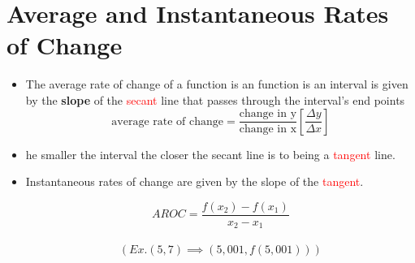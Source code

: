 \documentclass{article}
\begin{document}
\section{Average and Instantaneous Rates of Change }
\begin{itemize}
    \item The average rate of change of a function is an function is an interval is given by the \textbf{slope} of the \textcolor{red}{secant} line that passes through the interval's end points
    $$\text{average rate of change}= \frac{\text{change in y}}{\text{change in x}}\left[\frac{\Delta y}{\Delta x}\right]$$
    \item he smaller the interval the closer the secant line is to being a \textcolor{red}{tangent} line.
    \item Instantaneous rates of change are given by the slope of the \textcolor{red}{tangent}.

    $$AROC=\frac{f(x_2)-f(x_1)}{x_2 - x_1}$$\\
    $$(Ex. (5, 7) \implies (5, 001, f(5,001)))$$
\end{itemize}
\end{document}
